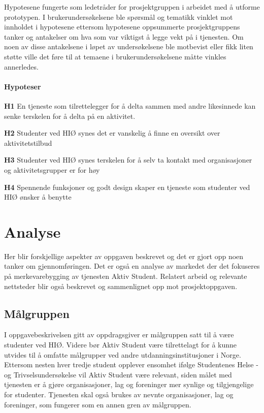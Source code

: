 Hypotesene fungerte som ledetråder for prosjektgruppen i arbeidet med å utforme prototypen. I brukerundersøkelsene ble spørsmål og tematikk vinklet mot innholdet i hypotesene ettersom hypotesene oppsummerte prosjektgruppens tanker og antakelser om hva som var viktigst å legge vekt på i tjenesten. Om noen av disse antakelsene i løpet av undersøkelsene ble motbevist eller fikk liten støtte ville det føre til at temaene i brukerundersøkelsene måtte vinkles annerledes.

\paragraph{Hypoteser}
\begin{compactitem}
\item[{\bf H1}] En tjeneste som tilrettelegger for å delta sammen med andre likesinnede kan senke terskelen for å delta på en aktivitet.
\item[{\bf H2}] Studenter ved HIØ synes det er vanskelig å finne en oversikt over aktivitetstilbud
\item[{\bf H3}] Studenter ved HIØ synes terskelen for å selv ta kontakt med organisasjoner og aktivitetsgrupper er for høy 
\item[{\bf H4}] Spennende funksjoner og godt design skaper en tjeneste som studenter ved HIØ ønsker å benytte
\end{compactitem}



\section{Analyse}
Her blir forskjellige aspekter av oppgaven beskrevet og det er gjort opp noen tanker om gjennomføringen. Det er også en analyse av markedet der det fokuseres på merkevarebygging av tjenesten Aktiv Student. Relatert arbeid og relevante nettsteder blir også beskrevet og sammenlignet opp mot prosjektoppgaven.

\subsection{Målgruppen}
I oppgavebeskrivelsen gitt av oppdragsgiver er målgruppen satt til å være studenter ved HIØ. Videre bør Aktiv Student være tilrettelagt for å kunne utvides til å omfatte målgrupper ved andre utdanningsinstitusjoner i Norge. 
Ettersom nesten hver tredje student opplever ensomhet ifølge Studentenes Helse -og Trivselsundersøkelse \cite{SHOT:2} vil Aktiv Student være relevant, siden målet med tjenesten er å gjøre organisasjoner, lag og foreninger mer synlige og tilgjengelige for studenter. Tjenesten skal også brukes av nevnte organisasjoner, lag og foreninger, som fungerer som en annen gren av målgruppen.


